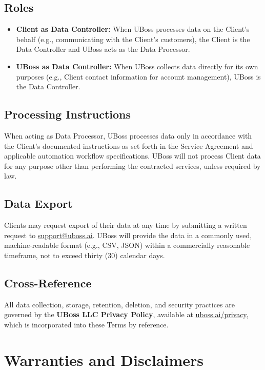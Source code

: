 \documentclass[11pt,letterpaper,parskip=half]{scrartcl}
\begin{document}
\subsection{Roles}

\begin{itemize}[nosep, leftmargin=1.5em]
    \item \textbf{Client as Data Controller:} When UBoss processes data on the Client's behalf (e.g., communicating with the Client's customers), the Client is the Data Controller and UBoss acts as the Data Processor.
    \item \textbf{UBoss as Data Controller:} When UBoss collects data directly for its own purposes (e.g., Client contact information for account management), UBoss is the Data Controller.
\end{itemize}

\subsection{Processing Instructions}

When acting as Data Processor, UBoss processes data only in accordance with the Client's documented instructions as set forth in the Service Agreement and applicable automation workflow specifications. UBoss will not process Client data for any purpose other than performing the contracted services, unless required by law.

\subsection{Data Export}

Clients may request export of their data at any time by submitting a written request to \href{mailto:support@uboss.ai}{support@uboss.ai}. UBoss will provide the data in a commonly used, machine-readable format (e.g., CSV, JSON) within a commercially reasonable timeframe, not to exceed thirty (30) calendar days.

\subsection{Cross-Reference}

All data collection, storage, retention, deletion, and security practices are governed by the \textbf{UBoss LLC Privacy Policy}, available at \href{https://uboss.ai/privacy}{uboss.ai/privacy}, which is incorporated into these Terms by reference.

\section{Warranties and Disclaimers}
\end{document}
